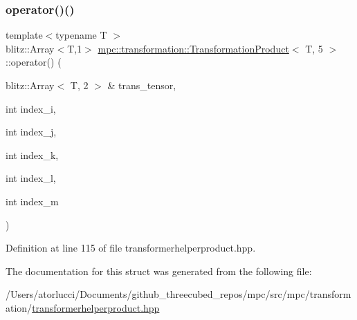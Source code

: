 \subsubsection{\texorpdfstring{operator()()}{operator()()}}
{\footnotesize\ttfamily template$<$typename T $>$ \\
blitz\+::\+Array$<$T,1$>$ \mbox{\hyperlink{structmpc_1_1transformation_1_1_transformation_product}{mpc\+::transformation\+::\+Transformation\+Product}}$<$ T, 5 $>$\+::operator() (\begin{DoxyParamCaption}\item[{blitz\+::\+Array$<$ T, 2 $>$ \&}]{trans\+\_\+tensor,  }\item[{int}]{index\+\_\+i,  }\item[{int}]{index\+\_\+j,  }\item[{int}]{index\+\_\+k,  }\item[{int}]{index\+\_\+l,  }\item[{int}]{index\+\_\+m }\end{DoxyParamCaption})\hspace{0.3cm}{\ttfamily [inline]}}



Definition at line 115 of file transformerhelperproduct.\+hpp.



The documentation for this struct was generated from the following file\+:\begin{DoxyCompactItemize}
\item 
/\+Users/atorlucci/\+Documents/github\+\_\+threecubed\+\_\+repos/mpc/src/mpc/transformation/\mbox{\hyperlink{transformerhelperproduct_8hpp}{transformerhelperproduct.\+hpp}}\end{DoxyCompactItemize}
